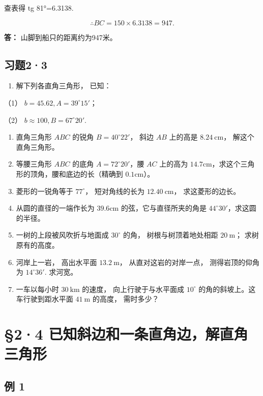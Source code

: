 查表得 tg 81°=6.3138.

\[
\therefore B C = 150 \times 6.3138 = 947.
\]

\textbf{答：} 山脚到船只的距离约为947米。

\subsection{习题2·3}

\begin{enumerate}
\item
  解下列各直角三角形， 已知：
\end{enumerate}

（1） \(b = 45.62, A = 39^{\circ}15'\)；

（2） \(b \approx 100, B = 67^{\circ}20'\).

\begin{enumerate}[start=2]
\item
  直角三角形 \(ABC\) 的锐角 \(B = 40^{\circ}22'\)， 斜边 \(AB\) 上的高是
  \(8.24 \mathrm{~cm}\)， 解这个直角三角形。
\item
  等腰三角形 \(ABC\) 的底角 \(A = 72^{\circ}20'\)，腰 \(AC\) 上的高为
  \(14.7\mathrm{cm}\)，求这个三角形的顶角，腰和底边的长（精确到
  \(0.1\mathrm{cm}\)）。
\item
  菱形的一锐角等于 \(77^{\circ}\)， 短对角线的长为
  \(12.40 \mathrm{~cm}\)， 求这菱形的边长。
\item
  从圆的直径的一端作长为 \(39.6\mathrm{cm}\) 的弦，它与直径所夹的角是
  \(44^{\circ}30'\)，求这圆的半径。
\item
  一树的上段被风吹折与地面成 \(30^{\circ}\) 的角， 树根与树顶着地处相距
  \(20 \mathrm{~m}\)； 求树原有的高度。
\item
  河岸上一岩， 高出水平面 \(13.2 \mathrm{~m}\)， 从直对这岩的对岸一点，
  测得岩顶的仰角为 \(14^{\circ}36'\). 求河宽。
\item
  一车以每小时 \(30 \mathrm{~km}\) 的速度， 向上行驶于与水平面成
  \(10^{\circ}\) 的角的斜坡上。这车行驶到距水平面 \(41 \mathrm{~m}\)
  的高度， 需时多少？
\end{enumerate}

\section{§2·4 已知斜边和一条直角边，解直角三角形}

\subsection{例 1}

